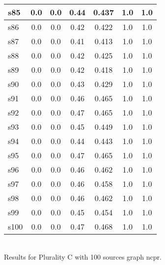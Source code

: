 \documentclass{article}
\begin{document}
\begin{tabular}{|l|c|c|c|c|c|c|}
\hline
s85 &0.0 & 0.0 & 0.44 & 0.437 & 1.0 & 1.0\\
\hline
s86 &0.0 & 0.0 & 0.42 & 0.422 & 1.0 & 1.0\\
\hline
s87 &0.0 & 0.0 & 0.41 & 0.413 & 1.0 & 1.0\\
\hline
s88 &0.0 & 0.0 & 0.42 & 0.425 & 1.0 & 1.0\\
\hline
s89 &0.0 & 0.0 & 0.42 & 0.418 & 1.0 & 1.0\\
\hline
s90 &0.0 & 0.0 & 0.43 & 0.429 & 1.0 & 1.0\\
\hline
s91 &0.0 & 0.0 & 0.46 & 0.465 & 1.0 & 1.0\\
\hline
s92 &0.0 & 0.0 & 0.47 & 0.465 & 1.0 & 1.0\\
\hline
s93 &0.0 & 0.0 & 0.45 & 0.449 & 1.0 & 1.0\\
\hline
s94 &0.0 & 0.0 & 0.44 & 0.443 & 1.0 & 1.0\\
\hline
s95 &0.0 & 0.0 & 0.47 & 0.465 & 1.0 & 1.0\\
\hline
s96 &0.0 & 0.0 & 0.46 & 0.462 & 1.0 & 1.0\\
\hline
s97 &0.0 & 0.0 & 0.46 & 0.458 & 1.0 & 1.0\\
\hline
s98 &0.0 & 0.0 & 0.46 & 0.462 & 1.0 & 1.0\\
\hline
s99 &0.0 & 0.0 & 0.45 & 0.454 & 1.0 & 1.0\\
\hline
s100 &0.0 & 0.0 & 0.47 & 0.468 & 1.0 & 1.0\\
\hline
\end{tabular}\\

\noindent Results for Plurality C with 100 sources graph ncpr.
\end{document}
